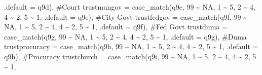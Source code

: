 \documentclass[
  letterpaper,
  DIV=11,
  numbers=noendperiod]{scrartcl}
\newenvironment{Shaded}{\begin{snugshade}}{\end{snugshade}}
\newcommand{\AttributeTok}[1]{\textcolor[rgb]{0.40,0.45,0.13}{#1}}
\newcommand{\CommentTok}[1]{\textcolor[rgb]{0.37,0.37,0.37}{#1}}
\newcommand{\ConstantTok}[1]{\textcolor[rgb]{0.56,0.35,0.01}{#1}}
\newcommand{\DecValTok}[1]{\textcolor[rgb]{0.68,0.00,0.00}{#1}}
\newcommand{\FunctionTok}[1]{\textcolor[rgb]{0.28,0.35,0.67}{#1}}
\newcommand{\NormalTok}[1]{\textcolor[rgb]{0.00,0.23,0.31}{#1}}
\newcommand{\SpecialCharTok}[1]{\textcolor[rgb]{0.37,0.37,0.37}{#1}}
\begin{document}
\begin{Shaded}
\begin{Highlighting}[]
                                 \AttributeTok{.default =}\NormalTok{ q9d), }\CommentTok{\#Court}
         \AttributeTok{trustmungov =} \FunctionTok{case\_match}\NormalTok{(q9e, }\DecValTok{99} \SpecialCharTok{\textasciitilde{}} \ConstantTok{NA}\NormalTok{, }\DecValTok{1} \SpecialCharTok{\textasciitilde{}} \DecValTok{5}\NormalTok{, }\DecValTok{2} \SpecialCharTok{\textasciitilde{}} \DecValTok{4}\NormalTok{, }\DecValTok{4} \SpecialCharTok{\textasciitilde{}} \DecValTok{2}\NormalTok{, }\DecValTok{5} \SpecialCharTok{\textasciitilde{}} \DecValTok{1}\NormalTok{, }
                                  \AttributeTok{.default =}\NormalTok{ q9e), }\CommentTok{\#City Gov\textquotesingle{}t}
         \AttributeTok{trustfedgov =} \FunctionTok{case\_match}\NormalTok{(q9f, }\DecValTok{99} \SpecialCharTok{\textasciitilde{}} \ConstantTok{NA}\NormalTok{, }\DecValTok{1} \SpecialCharTok{\textasciitilde{}} \DecValTok{5}\NormalTok{, }\DecValTok{2} \SpecialCharTok{\textasciitilde{}} \DecValTok{4}\NormalTok{, }\DecValTok{4} \SpecialCharTok{\textasciitilde{}} \DecValTok{2}\NormalTok{, }\DecValTok{5} \SpecialCharTok{\textasciitilde{}} \DecValTok{1}\NormalTok{, }
                                  \AttributeTok{.default =}\NormalTok{ q9f), }\CommentTok{\#Fed Gov\textquotesingle{}t}
         \AttributeTok{trustduma =} \FunctionTok{case\_match}\NormalTok{(q9g, }\DecValTok{99} \SpecialCharTok{\textasciitilde{}} \ConstantTok{NA}\NormalTok{, }\DecValTok{1} \SpecialCharTok{\textasciitilde{}} \DecValTok{5}\NormalTok{, }\DecValTok{2} \SpecialCharTok{\textasciitilde{}} \DecValTok{4}\NormalTok{, }\DecValTok{4} \SpecialCharTok{\textasciitilde{}} \DecValTok{2}\NormalTok{, }\DecValTok{5} \SpecialCharTok{\textasciitilde{}} \DecValTok{1}\NormalTok{, }
                                \AttributeTok{.default =}\NormalTok{ q9g), }\CommentTok{\#Duma}
         \AttributeTok{trustprocuracy =} \FunctionTok{case\_match}\NormalTok{(q9h, }\DecValTok{99} \SpecialCharTok{\textasciitilde{}} \ConstantTok{NA}\NormalTok{, }\DecValTok{1} \SpecialCharTok{\textasciitilde{}} \DecValTok{5}\NormalTok{, }\DecValTok{2} \SpecialCharTok{\textasciitilde{}} \DecValTok{4}\NormalTok{, }\DecValTok{4} \SpecialCharTok{\textasciitilde{}} \DecValTok{2}\NormalTok{, }\DecValTok{5} \SpecialCharTok{\textasciitilde{}} \DecValTok{1}\NormalTok{, }
                                     \AttributeTok{.default =}\NormalTok{ q9h), }\CommentTok{\#Procuracy}
         \AttributeTok{trustchurch =} \FunctionTok{case\_match}\NormalTok{(q9i, }\DecValTok{99} \SpecialCharTok{\textasciitilde{}} \ConstantTok{NA}\NormalTok{, }\DecValTok{1} \SpecialCharTok{\textasciitilde{}} \DecValTok{5}\NormalTok{, }\DecValTok{2} \SpecialCharTok{\textasciitilde{}} \DecValTok{4}\NormalTok{, }\DecValTok{4} \SpecialCharTok{\textasciitilde{}} \DecValTok{2}\NormalTok{, }\DecValTok{5} \SpecialCharTok{\textasciitilde{}} \DecValTok{1}\NormalTok{, }

\end{Highlighting}
\end{Shaded}
\end{document}
